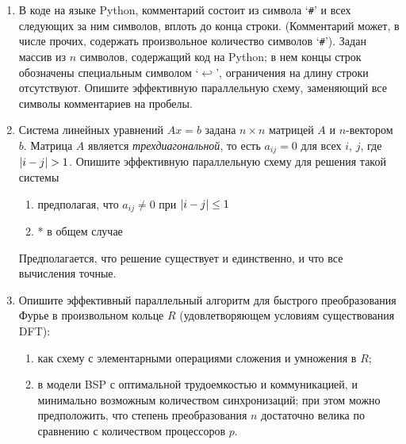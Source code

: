 \documentclass[11pt]{article}
\newenvironment{exercise}{\item}{}
\newcommand{\solution}[1]{}
\begin{document}
\begin{enumerate}
\begin{exercise}
В коде на языке Python, комментарий состоит из символа `\texttt{\#}' 
и всех следующих за ним символов, вплоть до конца строки.
(Комментарий может, в числе прочих, содержать произвольное количество символов `\texttt{\#}').
Задан массив из $n$ символов, содержащий код на Python;
в нем концы строк обозначены специальным символом `$\hookleftarrow$', 
ограничения на длину строки отсутствуют. 
Опишите эффективную параллельную схему, заменяющий все символы комментариев на пробелы.

\solution{
Let $b_i$ be a Boolean value indicating whether character $a_i$ is part of a comment.
We have
%
\begin{gather*}
%
b_i \equiv (a_i = \text{`\texttt{\%}'}) \lor ((a_i \neq \mathit{eol}) \land b_{i-1})
%
\end{gather*}
%
In this form, the problem is an instance 
of a generic first-order linear recurrence defining a Boolean array $b$
with coefficients evaluated as Boolean expressions 
$a_i = \text{`\texttt{\#}'}$, $a_i \neq \mathit{eol})$, 
where disjunction $\lor$ plays the role of addition,
and conjunction $\land$ that of multiplication.
Since both these operations are associative and $\land$ distributes over $\lor$,
we can apply the reduction to prefix sums over $2 \times 2$ matrix multiplication
shown in lectures to obtain an efficient circuit for this problem.
}

\end{exercise}

\begin{exercise}
Система линейных уравнений $Ax = b$ задана $n \times n$ матрицей $A$ и $n$-вектором $b$.
Матрица $A$ является \emph{трехдиагональной}, то есть $a_{ij}=0$ для всех $i$, $j$, где $\lvert i-j\rvert>1$.
Опишите эффективную параллельную схему для решения такой системы
%
\begin{enumerate}
%
\item предполагая, что $a_{ij} \neq 0$ при $\lvert i-j\rvert \leq 1$
\item* в общем случае
%
\end{enumerate}
%
Предполагается, что решение существует и единственно, и что все вычисления точные.

\solution{
Generalised linear recurrence on matrices}

\end{exercise}

\begin{exercise}
Опишите эффективный параллельный алгоритм для быстрого преобразования Фурье в произвольном кольце $R$
(удовлетворяющем условиям существования DFT):
%
\begin{enumerate}
%
\item как схему с элементарными операциями сложения и умножения в $R$;
%
\item в модели BSP с оптимальной трудоемкостью и коммуникацией, 
и минимально возможным количеством синхронизаций;
при этом можно предположить, что степень преобразования $n$ достаточно велика 
по сравнению с количеством процессоров $p$.
%
\end{enumerate}


\end{exercise}
\end{enumerate}
\end{document}
